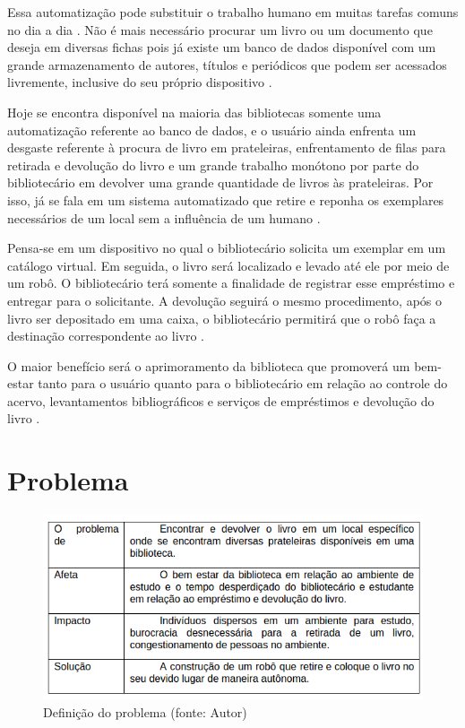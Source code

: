 Essa automatização pode substituir o trabalho humano em muitas tarefas comuns no dia a dia \cite{fraga2011}. Não é mais necessário procurar um livro ou um documento que deseja em diversas fichas pois já existe um banco de dados disponível com um grande armazenamento de autores, títulos e periódicos que podem ser acessados livremente, inclusive do seu próprio dispositivo \cite{santana2015}.

Hoje se encontra disponível na maioria das bibliotecas somente uma automatização referente ao banco de dados\cite{santana2015}, e o usuário ainda enfrenta um desgaste referente à procura de livro em prateleiras, enfrentamento de filas para retirada e devolução do livro e um grande trabalho monótono por parte do bibliotecário em devolver uma grande quantidade de livros às prateleiras. Por isso, já se fala em um sistema automatizado que retire e reponha os exemplares necessários de um local sem a influência de um humano \cite{fraga2011}. 

Pensa-se em um dispositivo no qual o bibliotecário solicita um exemplar em um catálogo virtual. Em seguida, o livro será localizado e levado até ele por meio de um robô. O bibliotecário terá somente a finalidade de registrar esse empréstimo e entregar para o solicitante.  A devolução seguirá o mesmo procedimento, após o livro ser depositado em uma caixa, o bibliotecário permitirá que o robô faça a destinação correspondente ao livro \cite{fraga2011}.

O maior benefício será o aprimoramento da biblioteca que promoverá um bem-estar tanto para o usuário quanto para o bibliotecário em relação ao controle do acervo, levantamentos bibliográficos e serviços de empréstimos e devolução do livro \cite{fraga2011}. 

\section{Problema}

\begin{figure}[!h]
\centering
\includegraphics[scale=0.60, angle = 360]{figuras/tabela_1}
\caption[]{Definição do problema (fonte: Autor)}
\label{Definição do problema}
\end{figure}
\FloatBarrier

